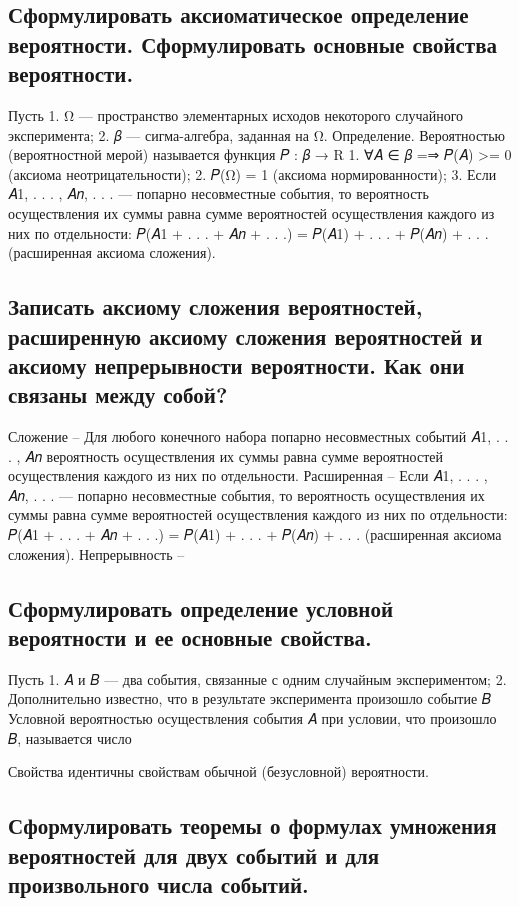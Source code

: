 \subsection{Сформулировать аксиоматическое определение вероятности. Сформулировать основные свойства вероятности.}

Пусть 
1. Ω — пространство элементарных исходов некоторого случайного эксперимента; 
2. 𝛽 — сигма-алгебра, заданная на Ω. 
Определение. Вероятностью (вероятностной мерой) называется функция 𝑃 : 𝛽 → R
1. ∀𝐴 ∈ 𝛽 =⇒ 𝑃(𝐴) >= 0 (аксиома неотрицательности);
2. 𝑃(Ω) = 1 (аксиома нормированности); 
3. Если 𝐴1, . . . , 𝐴𝑛, . . . — попарно несовместные события, то вероятность осуществления их суммы равна сумме вероятностей осуществления каждого из них по отдельности: 𝑃(𝐴1 + . . . + 𝐴𝑛 + . . .) = 𝑃(𝐴1) + . . . + 𝑃(𝐴𝑛) + . . . (расширенная аксиома сложения).

\subsection{Записать аксиому сложения вероятностей, расширенную аксиому сложения вероятностей и аксиому непрерывности вероятности. Как они связаны между собой?}

Сложение – Для любого конечного набора попарно несовместных событий 𝐴1, . . . , 𝐴𝑛 вероятность осуществления их суммы равна сумме вероятностей осуществления каждого из них по отдельности.
Расширенная – Если 𝐴1, . . . , 𝐴𝑛, . . . — попарно несовместные события, то вероятность осуществления их суммы равна сумме вероятностей осуществления каждого из них по отдельности: 𝑃(𝐴1 + . . . + 𝐴𝑛 + . . .) = 𝑃(𝐴1) + . . . + 𝑃(𝐴𝑛) + . . . (расширенная аксиома сложения).
Непрерывность –

\subsection{Сформулировать определение условной вероятности и ее основные свойства.}

Пусть 
1. 𝐴 и 𝐵 — два события, связанные с одним случайным экспериментом; 
2. Дополнительно известно, что в результате эксперимента произошло событие 𝐵
Условной вероятностью осуществления события 𝐴 при условии, что произошло 𝐵, называется число 

Свойства идентичны свойствам обычной (безусловной) вероятности.

\subsection{Сформулировать теоремы о формулах умножения вероятностей для двух событий и для произвольного числа событий.}


